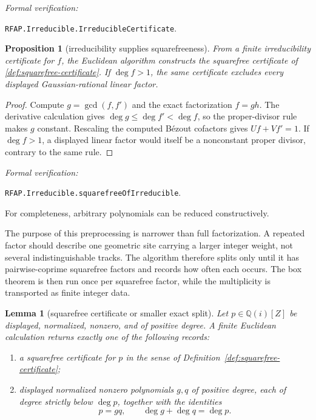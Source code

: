 \documentclass[11pt]{article}
\newtheorem{lemma}[theorem]{Lemma}
\newtheorem{proposition}[theorem]{Proposition}
\newcommand{\Qi}{\mathbb{Q}(i)}
\newcommand{\Defref}[1]{Definition~\ref{#1}}
\newcommand{\leanref}[1]{\par\smallskip\noindent
  \emph{Formal verification:}\par\nobreak
  {\raggedright\nolinkurl{#1}.\par}}
\begin{document}
\leanref{RFAP.Irreducible.IrreducibleCertificate}

\begin{proposition}[irreducibility supplies squarefreeness]
\label{prop:irreducible-squarefree}
From a finite irreducibility certificate for $f$, the Euclidean algorithm
constructs the squarefree certificate of
\cref{def:squarefree-certificate}.  If $\deg f>1$, the same certificate
excludes every displayed Gaussian-rational linear factor.
\end{proposition}

\begin{proof}
Compute $g=\gcd(f,f')$ and the exact factorization $f=gh$.  The derivative
calculation gives $\deg g\le\deg f'<\deg f$, so the proper-divisor rule makes
$g$ constant.  Rescaling the computed Bézout cofactors gives
$Uf+Vf'=1$.  If $\deg f>1$, a displayed linear factor would itself be a
nonconstant proper divisor, contrary to the same rule.
\end{proof}

\leanref{RFAP.Irreducible.squarefreeOfIrreducible}

For completeness, arbitrary polynomials can be reduced constructively.

The purpose of this preprocessing is narrower than full factorization.  A
repeated factor should describe one geometric site carrying a larger integer
weight, not several indistinguishable tracks.  The algorithm therefore splits
only until it has pairwise-coprime squarefree factors and records how often
each occurs.  The box theorem is then run once per squarefree factor, while
the multiplicity is transported as finite integer data.

\begin{lemma}[squarefree certificate or smaller exact split]
\label{lem:squarefree-or-split}
Let $p\in\Qi[Z]$ be displayed, normalized, nonzero, and of positive degree.
A finite Euclidean calculation returns exactly one of the following records:
\begin{enumerate}[label=(\roman*)]
\item a squarefree certificate for $p$ in the sense of
\Defref{def:squarefree-certificate};
\item displayed normalized nonzero polynomials $g,q$ of positive degree,
each of degree strictly below $\deg p$, together with the identities
\[
                 p=gq,
 \qquad
                 \deg g+\deg q=\deg p.
\]
\end{enumerate}
\end{lemma}
\end{document}
